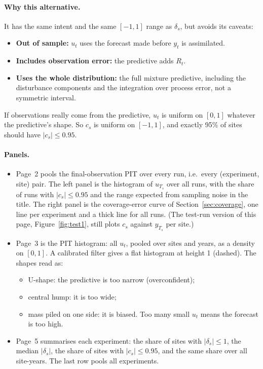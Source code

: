 \documentclass[11pt]{article}
\begin{document}
\paragraph{Why this alternative.} It has the same intent and the same $[-1, 1]$ range as
$\delta_s$, but avoids its caveats:
\begin{itemize}
  \item \textbf{Out of sample:} $u_t$ uses the forecast made before $y_t$ is assimilated.
  \item \textbf{Includes observation error:} the predictive adds $R_t$.
  \item \textbf{Uses the whole distribution:} the full mixture predictive, including the
  disturbance components and the integration over process error, not a symmetric
  interval.
\end{itemize}
If observations really come from the predictive, $u_t$ is uniform on $[0, 1]$ whatever
the predictive's shape. So $c_s$ is uniform on $[-1, 1]$, and exactly 95\% of sites
should have $|c_s| \le 0.95$.

\paragraph{Panels.}
\begin{itemize}
  \item Page~2 pools the final-observation PIT over every run, i.e.\ every
  (experiment, site) pair. The left panel is the histogram of $u_{T_s}$ over all runs,
  with the share of runs with $|c_s| \le 0.95$ and the range expected from sampling noise
  in the title. The right panel is the coverage-error curve of
  Section~\ref{sec:coverage}, one line per experiment and a thick line for all runs.
  (The test-run version of this page, Figure~\ref{fig:test1}, still plots $c_s$ against
  $y_{T_s}$ per site.)
  \item Page~3 is the PIT histogram: all $u_t$, pooled over sites and years, as a density
  on $[0, 1]$. A calibrated filter gives a flat histogram at height 1 (dashed). The
  shapes read as:
  \begin{itemize}
    \item U-shape: the predictive is too narrow (overconfident);
    \item central hump: it is too wide;
    \item mass piled on one side: it is biased. Too many small $u_t$ means the forecast
    is too high.
  \end{itemize}
  \item Page~5 summarises each experiment: the share of sites with $|\delta_s| \le 1$,
  the median $|\delta_s|$, the share of sites with $|c_s| \le 0.95$, and the same share
  over all site-years. The last row pools all experiments.
\end{itemize}
\end{document}
